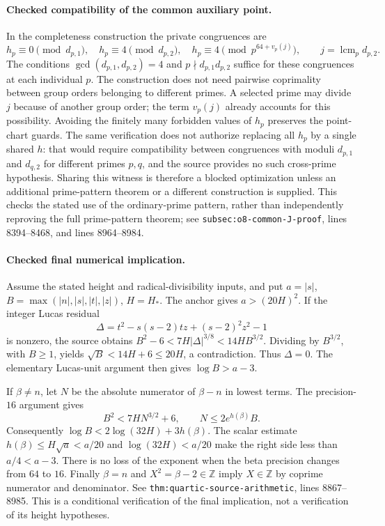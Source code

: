 \documentclass[11pt]{article}
\theoremstyle{definition}
\begin{document}
\paragraph{Checked compatibility of the common auxiliary point.}
In the completeness construction the private congruences are
\[
 h_p\equiv0\pmod{d_{p,1}},\quad
 h_p\equiv4\pmod{d_{p,2}},\quad
 h_p\equiv4\pmod{p^{64+v_p(j)}},\qquad
 j=\operatorname{lcm}_{p}d_{p,2}.
\]
The conditions $\gcd(d_{p,1},d_{p,2})=4$ and
$p\nmid d_{p,1}d_{p,2}$ suffice for these congruences at each
individual $p$.  The construction does not need pairwise coprimality
between group orders belonging to different primes.  A selected prime
may divide $j$ because of another group order; the term $v_p(j)$
already accounts for this possibility.  Avoiding the finitely many
forbidden values of $h_p$ preserves the point-chart guards.
The same verification does not authorize replacing all $h_p$ by a single
shared $h$: that would require compatibility between congruences with
moduli $d_{p,1}$ and $d_{q,2}$ for different primes $p,q$, and the source
provides no such cross-prime hypothesis.  Sharing this witness is therefore
a blocked optimization unless an additional prime-pattern theorem or a
different construction is supplied.  This checks the stated use of the
ordinary-prime pattern, rather than independently reproving the full
prime-pattern theorem; see
\texttt{subsec:o8-common-J-proof}, lines 8394--8468, and lines
8964--8984.

\paragraph{Checked final numerical implication.}
Assume the stated height and radical-divisibility inputs, and put
$a=|s|$, $B=\max(|n|,|s|,|t|,|z|)$, $H=H_*$.
The anchor gives $a>(20H)^2$.  If the integer Lucas residual
\[
 \Delta=t^2-s(s-2)tz+(s-2)^2z^2-1
\]
is nonzero, the source obtains
$B^2-6<7H|\Delta|^{3/8}<14HB^{3/2}$.
Dividing by $B^{3/2}$, with $B\ge1$, yields
$\sqrt B<14H+6\le20H$, a contradiction.  Thus $\Delta=0$.
The elementary Lucas-unit argument then gives $\log B>a-3$.

If $\beta\ne n$, let $N$ be the absolute numerator of
$\beta-n$ in lowest terms.  The precision-$16$ argument gives
\[
 B^2<7HN^{3/2}+6,\qquad N\le2e^{h(\beta)}B.
\]
Consequently
$\log B<2\log(32H)+3h(\beta)$.
The scalar estimate $h(\beta)\le H\sqrt a<a/20$ and
$\log(32H)<a/20$ make the right side less than $a/4<a-3$.
There is no loss of the exponent when the beta precision changes
from $64$ to $16$.  Finally $\beta=n$ and
$X^2=\beta-2\in\mathbb Z$ imply $X\in\mathbb Z$ by coprime
numerator and denominator.  See \nolinkurl{thm:quartic-source-arithmetic},
lines 8867--8985.  This is a conditional verification of the final
implication, not a verification of its height hypotheses.
\end{document}
